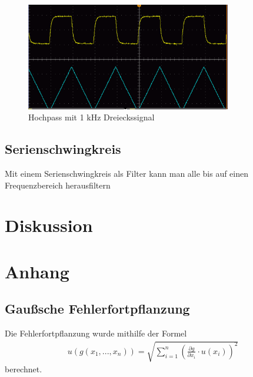 \documentclass[11pt, a4paper]{article}
\begin{document}
    \begin{figure}[h]
        \centering
        \includegraphics[width=0.8\textwidth]{Hochpass_differenzierend_tri.png}
        \caption{Hochpass mit 1 $\si{\kilo\hertz}$ Dreieckssignal}
        \label{im:Hotri}
    \end{figure}

    \subsection{Serienschwingkreis}
    Mit einem Serienschwingkreis als Filter kann man alle bis auf einen Frequenzbereich herausfiltern

    

    \section{Diskussion}

    \section{Anhang}
    \subsection{Gaußsche Fehlerfortpflanzung}
    Die Fehlerfortpflanzung wurde mithilfe der Formel
    \begin{align}
        u\left(g \left(x_1, ..., x_n\right)\right) = \sqrt{\sum_{i=1}^n \left( \frac{\partial g }{\partial x_i} \cdot u\left(x_i\right) \right)^2} \label{gauss}
    \end{align}
    berechnet.

    
    
\end{document}
